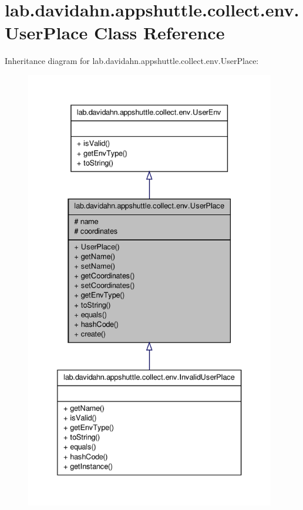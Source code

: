 \hypertarget{classlab_1_1davidahn_1_1appshuttle_1_1collect_1_1env_1_1_user_place}{\section{lab.\-davidahn.\-appshuttle.\-collect.\-env.\-User\-Place \-Class \-Reference}
\label{classlab_1_1davidahn_1_1appshuttle_1_1collect_1_1env_1_1_user_place}
}


\-Inheritance diagram for lab.\-davidahn.\-appshuttle.\-collect.\-env.\-User\-Place\-:
\nopagebreak
\begin{figure}[H]
\begin{center}
\leavevmode
\includegraphics[height=550pt]{classlab_1_1davidahn_1_1appshuttle_1_1collect_1_1env_1_1_user_place__inherit__graph}
\end{center}
\end{figure}


